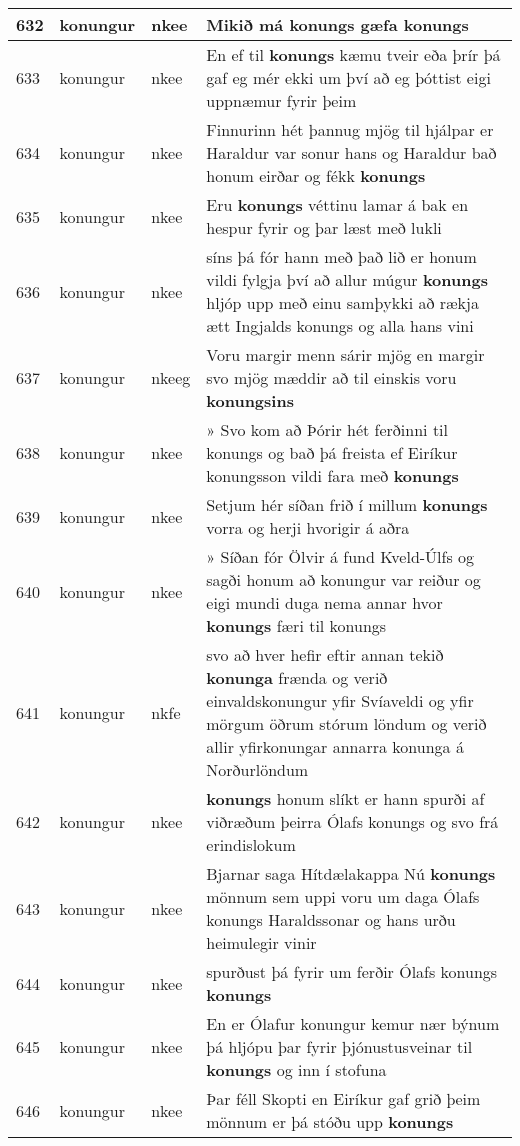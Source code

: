 \documentclass{article}
\begin{document}
\begin{longtable}{p{1cm}|p{1cm}|p{1cm}|p{13cm}}
\hline
632&konungur&nkee&Mikið má konungs gæfa \textbf{konungs} \\
\hline
633&konungur&nkee&En ef til \textbf{konungs} kæmu tveir eða þrír þá gaf eg mér ekki um því að eg þóttist eigi uppnæmur fyrir þeim\\
\hline
634&konungur&nkee&Finnurinn hét þannug mjög til hjálpar er Haraldur var sonur hans og Haraldur bað honum eirðar og fékk \textbf{konungs} \\
\hline
635&konungur&nkee&Eru \textbf{konungs} véttinu lamar á bak en hespur fyrir og þar læst með lukli\\
\hline
636&konungur&nkee&síns þá fór hann með það lið er honum vildi fylgja því að allur múgur \textbf{konungs} hljóp upp með einu samþykki að rækja ætt Ingjalds konungs og alla hans vini\\
\hline
637&konungur&nkeeg&Voru margir menn sárir mjög en margir svo mjög mæddir að til einskis voru \textbf{konungsins} \\
\hline
638&konungur&nkee&» Svo kom að Þórir hét ferðinni til konungs og bað þá freista ef Eiríkur konungsson vildi fara með \textbf{konungs} \\
\hline
639&konungur&nkee&Setjum hér síðan frið í millum \textbf{konungs} vorra og herji hvorigir á aðra\\
\hline
640&konungur&nkee&» Síðan fór Ölvir á fund Kveld-Úlfs og sagði honum að konungur var reiður og eigi mundi duga nema annar hvor \textbf{konungs} færi til konungs\\
\hline
641&konungur&nkfe&svo að hver hefir eftir annan tekið \textbf{konunga} frænda og verið einvaldskonungur yfir Svíaveldi og yfir mörgum öðrum stórum löndum og verið allir yfirkonungar annarra konunga á Norðurlöndum\\
\hline
642&konungur&nkee& \textbf{konungs} honum slíkt er hann spurði af viðræðum þeirra Ólafs konungs og svo frá erindislokum\\
\hline
643&konungur&nkee&Bjarnar saga Hítdælakappa Nú \textbf{konungs} mönnum sem uppi voru um daga Ólafs konungs Haraldssonar og hans urðu heimulegir vinir\\
\hline
644&konungur&nkee&spurðust þá fyrir um ferðir Ólafs konungs \textbf{konungs} \\
\hline
645&konungur&nkee&En er Ólafur konungur kemur nær býnum þá hljópu þar fyrir þjónustusveinar til \textbf{konungs} og inn í stofuna\\
\hline
646&konungur&nkee&Þar féll Skopti en Eiríkur gaf grið þeim mönnum er þá stóðu upp \textbf{konungs} \\

\end{longtable}
\end{document}
